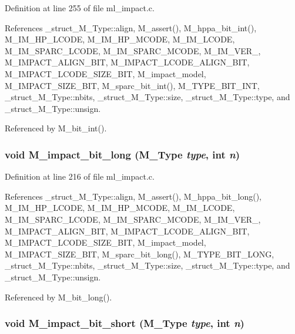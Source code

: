 Definition at line 255 of file ml\_\-impact.c.

References \_\-struct\_\-M\_\-Type::align, M\_\-assert(), M\_\-hppa\_\-bit\_\-int(), M\_\-IM\_\-HP\_\-LCODE, M\_\-IM\_\-HP\_\-MCODE, M\_\-IM\_\-LCODE, M\_\-IM\_\-SPARC\_\-LCODE, M\_\-IM\_\-SPARC\_\-MCODE, M\_\-IM\_\-VER\_, M\_\-IMPACT\_\-ALIGN\_\-BIT, M\_\-IMPACT\_\-LCODE\_\-ALIGN\_\-BIT, M\_\-IMPACT\_\-LCODE\_\-SIZE\_\-BIT, M\_\-impact\_\-model, M\_\-IMPACT\_\-SIZE\_\-BIT, M\_\-sparc\_\-bit\_\-int(), M\_\-TYPE\_\-BIT\_\-INT, \_\-struct\_\-M\_\-Type::nbits, \_\-struct\_\-M\_\-Type::size, \_\-struct\_\-M\_\-Type::type, and \_\-struct\_\-M\_\-Type::unsign.

Referenced by M\_\-bit\_\-int().
\subsubsection{\setlength{\rightskip}{0pt plus 5cm}void M\_\-impact\_\-bit\_\-long (\bf{M\_\-Type} {\em type}, int {\em n})}\label{m__impact_8h_addedb5ab4da29436e92243f51462890}




Definition at line 216 of file ml\_\-impact.c.

References \_\-struct\_\-M\_\-Type::align, M\_\-assert(), M\_\-hppa\_\-bit\_\-long(), M\_\-IM\_\-HP\_\-LCODE, M\_\-IM\_\-HP\_\-MCODE, M\_\-IM\_\-LCODE, M\_\-IM\_\-SPARC\_\-LCODE, M\_\-IM\_\-SPARC\_\-MCODE, M\_\-IM\_\-VER\_, M\_\-IMPACT\_\-ALIGN\_\-BIT, M\_\-IMPACT\_\-LCODE\_\-ALIGN\_\-BIT, M\_\-IMPACT\_\-LCODE\_\-SIZE\_\-BIT, M\_\-impact\_\-model, M\_\-IMPACT\_\-SIZE\_\-BIT, M\_\-sparc\_\-bit\_\-long(), M\_\-TYPE\_\-BIT\_\-LONG, \_\-struct\_\-M\_\-Type::nbits, \_\-struct\_\-M\_\-Type::size, \_\-struct\_\-M\_\-Type::type, and \_\-struct\_\-M\_\-Type::unsign.

Referenced by M\_\-bit\_\-long().
\subsubsection{\setlength{\rightskip}{0pt plus 5cm}void M\_\-impact\_\-bit\_\-short (\bf{M\_\-Type} {\em type}, int {\em n})}\label{m__impact_8h_14aa64b9319ab1623ba269cbc125127b}




